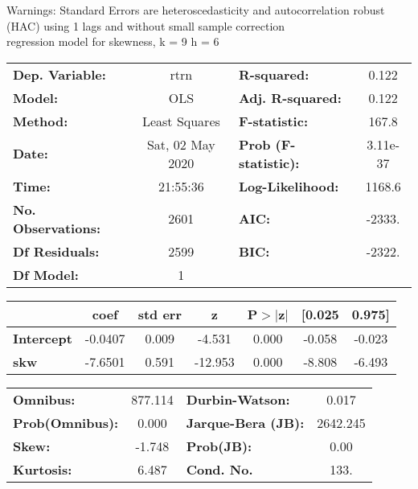 Warnings: \newline
 [1] Standard Errors are heteroscedasticity and autocorrelation robust (HAC) using 1 lags and without small sample correction\\ 

regression model for skewness, k = 9 h = 6\begin{center}
\begin{tabular}{lclc}
\toprule
\textbf{Dep. Variable:}    &       rtrn       & \textbf{  R-squared:         } &     0.122   \\
\textbf{Model:}            &       OLS        & \textbf{  Adj. R-squared:    } &     0.122   \\
\textbf{Method:}           &  Least Squares   & \textbf{  F-statistic:       } &     167.8   \\
\textbf{Date:}             & Sat, 02 May 2020 & \textbf{  Prob (F-statistic):} &  3.11e-37   \\
\textbf{Time:}             &     21:55:36     & \textbf{  Log-Likelihood:    } &    1168.6   \\
\textbf{No. Observations:} &        2601      & \textbf{  AIC:               } &    -2333.   \\
\textbf{Df Residuals:}     &        2599      & \textbf{  BIC:               } &    -2322.   \\
\textbf{Df Model:}         &           1      & \textbf{                     } &             \\
\bottomrule
\end{tabular}
\begin{tabular}{lcccccc}
                   & \textbf{coef} & \textbf{std err} & \textbf{z} & \textbf{P$> |$z$|$} & \textbf{[0.025} & \textbf{0.975]}  \\
\midrule
\textbf{Intercept} &      -0.0407  &        0.009     &    -4.531  &         0.000        &       -0.058    &       -0.023     \\
\textbf{skw}       &      -7.6501  &        0.591     &   -12.953  &         0.000        &       -8.808    &       -6.493     \\
\bottomrule
\end{tabular}
\begin{tabular}{lclc}
\textbf{Omnibus:}       & 877.114 & \textbf{  Durbin-Watson:     } &    0.017  \\
\textbf{Prob(Omnibus):} &   0.000 & \textbf{  Jarque-Bera (JB):  } & 2642.245  \\
\textbf{Skew:}          &  -1.748 & \textbf{  Prob(JB):          } &     0.00  \\
\textbf{Kurtosis:}      &   6.487 & \textbf{  Cond. No.          } &     133.  \\
\bottomrule
\end{tabular}
\end{center}


